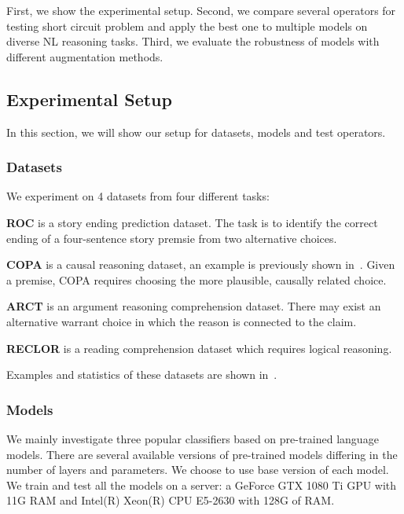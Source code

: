 

First, we show the experimental setup. 
Second, we compare several operators for testing short circuit problem and apply the best one to multiple models on diverse NL reasoning tasks.
Third, we evaluate the robustness of models with different augmentation methods.

\subsection{Experimental Setup} 
\label{sec:setup}
In this section, we will show our setup for datasets, models and test operators.
\subsubsection{Datasets}
We experiment on 4 datasets from four different tasks:

\textbf{ROC} is a story ending prediction dataset. 
The task is to identify the correct ending of a four-sentence 
story premsie from two alternative choices. 

\textbf{COPA} is a causal reasoning dataset, an example is previously shown
in~. Given a premise, 
COPA requires choosing the more plausible, causally related choice. 

\textbf{ARCT} is an argument reasoning comprehension dataset. 
There may exist an alternative warrant choice 
in which the reason is connected to the claim.

\textbf{RECLOR} is a reading comprehension dataset which requires logical reasoning.

Examples and statistics of these datasets are shown in~. 

\subsubsection{Models}
We mainly investigate three popular classifiers based on pre-trained language models. 
There are several available versions of pre-trained models differing in the number of layers and parameters. We choose to use base version of each model. We train and test all the models on a server: a GeForce GTX 1080 Ti GPU with 11G RAM and Intel(R) Xeon(R) CPU E5-2630 with 128G of RAM.

